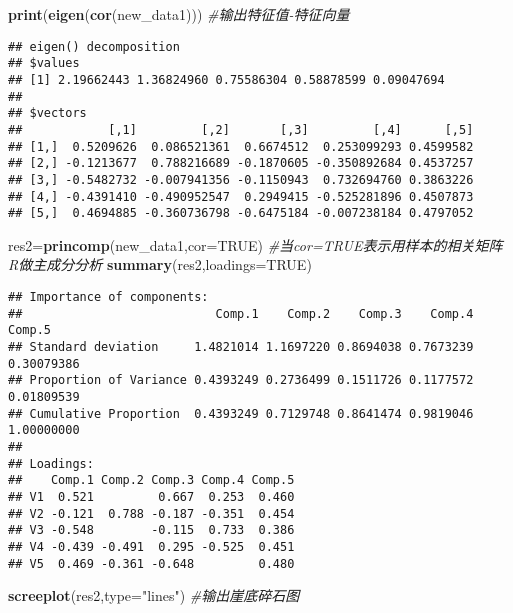 \documentclass[
]{article}
\newenvironment{Shaded}{\begin{snugshade}}{\end{snugshade}}
\newcommand{\CommentTok}[1]{\textcolor[rgb]{0.56,0.35,0.01}{\textit{#1}}}
\newcommand{\DataTypeTok}[1]{\textcolor[rgb]{0.13,0.29,0.53}{#1}}
\newcommand{\KeywordTok}[1]{\textcolor[rgb]{0.13,0.29,0.53}{\textbf{#1}}}
\newcommand{\NormalTok}[1]{#1}
\newcommand{\OtherTok}[1]{\textcolor[rgb]{0.56,0.35,0.01}{#1}}
\newcommand{\StringTok}[1]{\textcolor[rgb]{0.31,0.60,0.02}{#1}}
\begin{document}
\begin{Shaded}
\begin{Highlighting}[]
\KeywordTok{print}\NormalTok{(}\KeywordTok{eigen}\NormalTok{(}\KeywordTok{cor}\NormalTok{(new_data1))) }\CommentTok{#输出特征值-特征向量}
\end{Highlighting}
\end{Shaded}

\begin{verbatim}
## eigen() decomposition
## $values
## [1] 2.19662443 1.36824960 0.75586304 0.58878599 0.09047694
## 
## $vectors
##            [,1]         [,2]       [,3]         [,4]      [,5]
## [1,]  0.5209626  0.086521361  0.6674512  0.253099293 0.4599582
## [2,] -0.1213677  0.788216689 -0.1870605 -0.350892684 0.4537257
## [3,] -0.5482732 -0.007941356 -0.1150943  0.732694760 0.3863226
## [4,] -0.4391410 -0.490952547  0.2949415 -0.525281896 0.4507873
## [5,]  0.4694885 -0.360736798 -0.6475184 -0.007238184 0.4797052
\end{verbatim}

\begin{Shaded}
\begin{Highlighting}[]
\NormalTok{res2=}\KeywordTok{princomp}\NormalTok{(new_data1,}\DataTypeTok{cor=}\OtherTok{TRUE}\NormalTok{) }\CommentTok{#当cor=TRUE表示用样本的相关矩阵R做主成分分析}
\KeywordTok{summary}\NormalTok{(res2,}\DataTypeTok{loadings=}\OtherTok{TRUE}\NormalTok{)}
\end{Highlighting}
\end{Shaded}

\begin{verbatim}
## Importance of components:
##                           Comp.1    Comp.2    Comp.3    Comp.4     Comp.5
## Standard deviation     1.4821014 1.1697220 0.8694038 0.7673239 0.30079386
## Proportion of Variance 0.4393249 0.2736499 0.1511726 0.1177572 0.01809539
## Cumulative Proportion  0.4393249 0.7129748 0.8641474 0.9819046 1.00000000
## 
## Loadings:
##    Comp.1 Comp.2 Comp.3 Comp.4 Comp.5
## V1  0.521         0.667  0.253  0.460
## V2 -0.121  0.788 -0.187 -0.351  0.454
## V3 -0.548        -0.115  0.733  0.386
## V4 -0.439 -0.491  0.295 -0.525  0.451
## V5  0.469 -0.361 -0.648         0.480
\end{verbatim}

\begin{Shaded}
\begin{Highlighting}[]
\KeywordTok{screeplot}\NormalTok{(res2,}\DataTypeTok{type=}\StringTok{"lines"}\NormalTok{) }\CommentTok{#输出崖底碎石图}
\end{Highlighting}
\end{Shaded}
\end{document}
